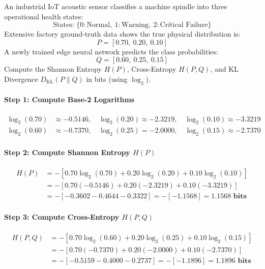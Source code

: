 \begin{example}
An industrial IoT acoustic sensor classifies a machine spindle into three operational health states:
\begin{equation*}
\text{States: } \{0: \text{Normal}, \ 1: \text{Warning}, \ 2: \text{Critical Failure}\}
\end{equation*}
Extensive factory ground-truth data shows the true physical distribution is:
\begin{equation*}
P = [0.70, \ 0.20, \ 0.10]
\end{equation*}
A newly trained edge neural network predicts the class probabilities:
\begin{equation*}
Q = [0.60, \ 0.25, \ 0.15]
\end{equation*}
Compute the Shannon Entropy $H(P)$, Cross-Entropy $H(P, Q)$, and KL Divergence $D_{\text{KL}}(P \parallel Q)$ in bits (using $\log_2$).

\paragraph{Step 1: Compute Base-2 Logarithms}
\begin{align*}
\log_2(0.70) &\approx -0.5146, \quad \log_2(0.20) \approx -2.3219, \quad \log_2(0.10) \approx -3.3219 \\
\log_2(0.60) &\approx -0.7370, \quad \log_2(0.25) = -2.0000, \quad \log_2(0.15) \approx -2.7370
\end{align*}

\paragraph{Step 2: Compute Shannon Entropy $H(P)$}
\begin{align*}
H(P) &= -\left[ 0.70 \log_2(0.70) + 0.20 \log_2(0.20) + 0.10 \log_2(0.10) \right] \\
&= -\left[ 0.70(-0.5146) + 0.20(-2.3219) + 0.10(-3.3219) \right] \\
&= -\left[ -0.3602 - 0.4644 - 0.3322 \right] = -[-1.1568] = \mathbf{1.1568\text{ bits}}
\end{align*}

\paragraph{Step 3: Compute Cross-Entropy $H(P, Q)$}
\begin{align*}
H(P, Q) &= -\left[ 0.70 \log_2(0.60) + 0.20 \log_2(0.25) + 0.10 \log_2(0.15) \right] \\
&= -\left[ 0.70(-0.7370) + 0.20(-2.0000) + 0.10(-2.7370) \right] \\
&= -\left[ -0.5159 - 0.4000 - 0.2737 \right] = -[-1.1896] = \mathbf{1.1896\text{ bits}}
\end{align*}


\end{example}
